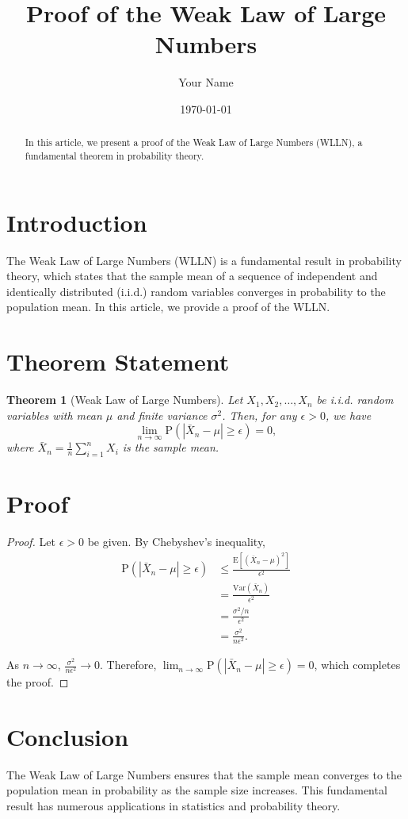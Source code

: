 \documentclass{article}
\title{Proof of the Weak Law of Large Numbers}
\author{Your Name}
\date{\today}
\newtheorem{theorem}{Theorem}
\begin{document}
\maketitle

\begin{abstract}
    In this article, we present a proof of the Weak Law of Large Numbers (WLLN), a fundamental theorem in probability theory.
\end{abstract}

\section{Introduction}

The Weak Law of Large Numbers (WLLN) is a fundamental result in probability theory, which states that the sample mean of a sequence of independent and identically distributed (i.i.d.) random variables converges in probability to the population mean. In this article, we provide a proof of the WLLN.

\section{Theorem Statement}

\begin{theorem}[Weak Law of Large Numbers]
    Let $X_1, X_2, \ldots, X_n$ be i.i.d. random variables with mean $\mu$ and finite variance $\sigma^2$. Then, for any $\epsilon > 0$, we have
    \[
        \lim_{n \to \infty} \mathrm{P}\left(|\bar{X}_n - \mu| \geq \epsilon\right) = 0,
    \]
    where $\bar{X}_n = \frac{1}{n} \sum_{i=1}^{n} X_i$ is the sample mean.
\end{theorem}

\section{Proof}

\begin{proof}
    Let $\epsilon > 0$ be given. By Chebyshev's inequality,
    \begin{align*}
        \mathrm{P}\left(|\bar{X}_n - \mu| \geq \epsilon\right) &\leq \frac{\mathrm{E}[(\bar{X}_n - \mu)^2]}{\epsilon^2} \\
        &= \frac{\mathrm{Var}(\bar{X}_n)}{\epsilon^2} \\
        &= \frac{\sigma^2/n}{\epsilon^2} \\
        &= \frac{\sigma^2}{n\epsilon^2}.
    \end{align*}
    
    As $n \to \infty$, $\frac{\sigma^2}{n\epsilon^2} \to 0$. Therefore, $\lim_{n \to \infty} \mathrm{P}\left(|\bar{X}_n - \mu| \geq \epsilon\right) = 0$, which completes the proof.
\end{proof}

\section{Conclusion}

The Weak Law of Large Numbers ensures that the sample mean converges to the population mean in probability as the sample size increases. This fundamental result has numerous applications in statistics and probability theory.
\end{document}
